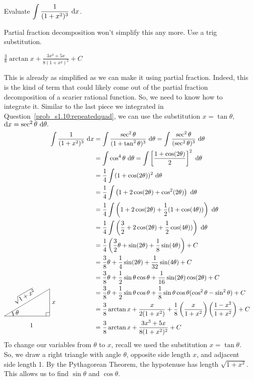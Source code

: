 \begin{question}
Evaluate $\displaystyle\int\frac{1}{(1+x^2)^3}~\mathrm{d}x$.
\end{question}
\begin{hint}
Partial fraction decomposition won't simplify this any more. Use a trig substitution.
\end{hint}
\begin{answer}
$\displaystyle\frac{3}{8}\arctan x + \frac{3x^3+5x}{8(1+x^2)^2}+C$
\end{answer}
\begin{solution}
This is already as simplified as we can make it using partial fraction. Indeed, this is the kind of term that could likely come out of the partial fraction decomposition of a scarier rational function. So, we need to know how to integrate it. Similar to the last piece we integrated in Question~\ref{prob_s1.10:repeatedquad}, we can use the substitution $x=\tan\theta$, $\mathrm{d}x = \sec^2\theta~\mathrm{d}\theta.$
\begin{align*}
\int\frac{1}{(1+x^2)^3}~\dee{x}&=\int \frac{\sec^2\theta}{(1+\tan^2\theta)^3}~\dee{\theta}
=\int \frac{\sec^2\theta}{(\sec^2\theta)^3}~\dee{\theta}\\
&=\int \cos^4\theta~\dee{\theta}
=\int \left[\frac{1+\cos(2\theta)}{2}\right]^2~\dee{\theta} \\
&= \frac{1}{4}\int (1+\cos(2\theta))^2~\dee{\theta}\\
&=\frac{1}{4}\int\left(1+2\cos(2\theta)+\cos^2(2\theta)\right)~\dee{\theta}\\
&=\frac{1}{4}\int\left(1+2\cos(2\theta)+\frac{1}{2}(1+\cos(4\theta))\right)~\dee{\theta}\\
&=\frac{1}{4}\int\left(\frac{3}{2}+2\cos(2\theta)+\frac{1}{2}\cos(4\theta))\right)~\dee{\theta}\\
&=\frac{1}{4}\left(\frac{3}{2}\theta + \sin(2\theta) +\frac{1}{8}\sin(4\theta)\right)+C\\
&=\frac{3}{8}\theta + \frac{1}{4}\sin(2\theta) +\frac{1}{32}\sin(4\theta)+C\\
&=\frac{3}{8}\theta + \frac{1}{2}\sin\theta\cos\theta +\frac{1}{16}\sin(2\theta)\cos(2\theta)+C\\
&=\frac{3}{8}\theta + \frac{1}{2}\sin\theta\cos\theta +\frac{1}{8}\sin\theta\cos\theta(\cos^2\theta-\sin^2\theta)+C\\
&=\frac{3}{8}\arctan x + \frac{x}{2(1+x^2)}+\frac{1}{8}\left(\frac{x}{1+x^2}\right)\left(\frac{1-x^2}{1+x^2}\right)+C\\
\smash{\trigtri{\theta}{1}{x}{\sqrt{1+x^2}}}\hspace{2cm}&=\frac{3}{8}\arctan x + \frac{3x^3+5x}{8(1+x^2)^2}+C
\end{align*}
To change our variables from $\theta$ to $x$, recall we used the substitution $x=\tan\theta$. So, we draw a right triangle with angle $\theta$, opposite side length $x$, and adjacent side length 1. By the Pythagorean Theorem, the hypotenuse has length $\sqrt{1+x^2}$. This allows us to find $\sin\theta$ and $\cos\theta$.
\end{solution}

